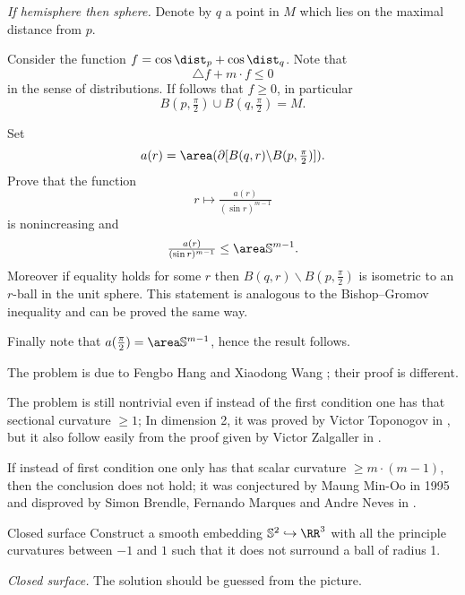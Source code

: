 \textit{If hemisphere then sphere.}
Denote by $q$ a point in $M$ which lies on the maximal distance from $p$.

Consider the function $f=\cos \dist_p+\cos\dist_q$.
Note that 
\[\triangle f+m\cdot f\le 0\] 
in the sense of distributions.
If follows that $f\ge 0$, in particular 
\[B(p,\tfrac\pi2)\cup B(q,\tfrac\pi2)=M.\]

Set \[a(r)=\area(\partial [B(q,r)\backslash B(p,\tfrac\pi2)]).\]
Prove that the function
\[r \mapsto \tfrac{a(r)}{(\sin r)^{m-1}}\]
is nonincreasing 
and 
\[\tfrac{a(r)}{(\sin r)^{m-1}}\le\area\mathbb{S}^{m-1}.\]
Moreover if equality holds for some $r$ then $B(q,r)\backslash B(p,\tfrac\pi2)$ is isometric to an $r$-ball in the unit sphere.
This statement is analogous to the Bishop--Gromov inequality and can be proved the same way.

Finally note that $a(\tfrac\pi2)=\area\mathbb{S}^{m-1}$,
hence the result follows.
 

The problem is due to Fengbo Hang %
and Xiaodong Wang %
\cite{hang-wang};
their proof is different.

The problem is still nontrivial 
even if instead of the first condition one has that sectional curvature $\ge 1$;
In dimension 2, 
it was proved by Victor Toponogov in \cite{toponogov},
but it also follow easily from the proof given by Victor Zalgaller in \cite{zalgaller-shperical-polygon}.


If instead of first condition one only has that scalar curvature $\ge m\cdot(m-1)$, then the conclusion does not hold; 
it was conjectured by Maung Min-Oo in 1995 
and disproved by
Simon Brendle,
Fernando Marques
and Andre Neves in \cite{brendle-marques-neve}.











\begin{pr}{}{Closed surface}\label{3D-moon-in-puddle}
Construct a smooth embedding $\mathbb{S}^2\hookrightarrow \RR^3$ 
with all the principle curvatures between $-1$ and $1$
such that it does not surround a ball of radius 1.
\end{pr}



\textit{Closed surface.}
The solution should be guessed from the picture.

